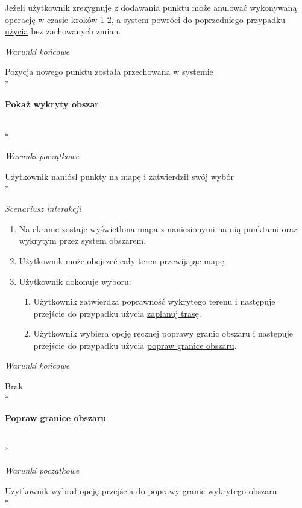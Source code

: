 \begin{adjustwidth}{1.5em}{}
Jeżeli użytkownik zrezygnuje z dodawania punktu może anulować wykonywaną operację w czasie kroków 1-2, a system powróci do \hyperlink{plan route}{poprzedniego przypadku użycia} bez zachowanych zmian.   
\end{adjustwidth}

\vspace{\baselineskip}
\textit{Warunki końcowe}

Pozycja nowego punktu została przechowana w systemie \\*

\hypertarget{show detected area}{\textbf{Pokaż wykryty obszar}} \\*

\textit{Warunki początkowe}

Użytkownik naniósł punkty na mapę i zatwierdził swój wybór \\*

\textit{Scenariusz interakcji}
\begin{enumerate}[label=\arabic*.,ref=\arabic*]
    \item Na ekranie zostaje wyświetlona mapa z naniesionymi na nią punktami oraz wykrytym przez system obszarem.
    \item Użytkownik może obejrzeć cały teren przewijając mapę
    \item Użytkownik dokonuje wyboru:
    \begin{enumerate}[label=\arabic{enumi}.\arabic*.,ref=\arabic{enumi}.\arabic*]
        \item Użytkownik zatwierdza poprawność wykrytego terenu i następuje przejście do przypadku użycia \hyperlink{plan route}{zaplanuj trasę}.
        \item Użytkownik wybiera opcję ręcznej poprawy granic obszaru i następuje przejście do przypadku użycia \hyperlink{change area border}{popraw granice obszaru}.
    \end{enumerate}
\end{enumerate}

\vspace{\baselineskip}
\textit{Warunki końcowe}

Brak \\*

\hypertarget{change area border}{\textbf{Popraw granice obszaru}} \\*

\textit{Warunki początkowe}

Użytkownik wybrał opcję przejścia do poprawy granic wykrytego obszaru \\*

